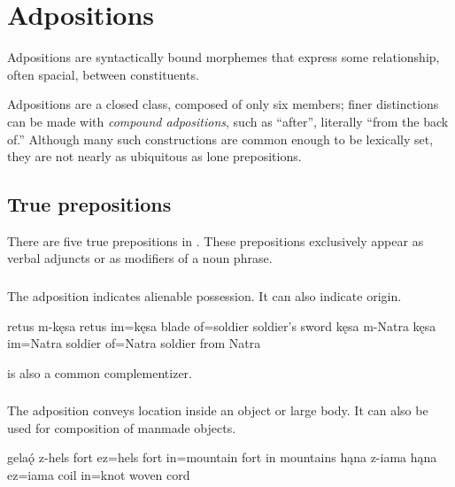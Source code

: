 \setchapterpreamble[u]{\margintoc}
\chapter{Adpositions}
Adpositions are syntactically bound morphemes that express some relationship, often spacial, between constituents. %

Adpositions are a closed class, composed of only six members; finer distinctions can be made with \emph{compound adpositions}, such as  “after”, literally “from the back of.” Although many such constructions are common enough to be lexically set, they are not nearly as ubiquitous as lone prepositions.

\section{True prepositions}
There are five true prepositions in \langname{}. These prepositions exclusively appear as verbal adjuncts or as modifiers of a noun phrase.

\subsection{}
The adposition  indicates alienable possession. It can also indicate origin. 

\begin{subexamples}
    \ex 
        \script retus m-kęsa
        \bits retus im=kęsa
        \gloss blade of=soldier
        \tr soldier's sword
    \ex
        \script kęsa m-Natra
        \bits kęsa im=Natra
        \gloss soldier of=Natra
        \tr soldier from Natra
\end{subexamples}

 is also a common complementizer.

\subsection{}
The adposition  conveys location inside an object or large body. It can also be used for composition of manmade objects.

\begin{subexamples}
    \ex 
        \script gelaǫ́ z-hels
        \bits fort ez=hels
        \gloss fort in=mountain
        \tr fort in mountains
    \ex
        \script hąna z-iama
        \bits hąna ez=iama
        \gloss coil in=knot
        \tr woven cord
\end{subexamples}


